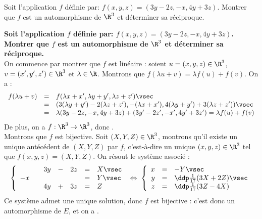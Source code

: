 \documentclass[a4paper, 11pt,reqno]{article}
\begin{document}
\begin{exercice}  \;
	Soit l'application $f$ d\'efinie par: $f(x,y,z)=(3y-2z,-x,4y+3z)$. Montrer que $f$ est un automorphisme de $\R^3$ et d\'eterminer sa r\'eciproque.
\end{exercice}
\begin{correction}  \;
	\textbf{Soit l'application $f$ d\'efinie par: $f(x,y,z)=(3y-2z,-x,4y+3z)$. Montrer que $f$ est un automorphisme de $\R^3$ et d\'eterminer sa r\'eciproque.}\\
	On commence par montrer que $f$ est lin\'eaire : soient $u=(x,y,z) \in \R^3$, $v=(x',y',z') \in \R^3$ et $\lambda \in \R$. Montrons que $f(\lambda u + v) = \lambda f(u) + f(v)$. On a :
	$$\begin{array}{rcl}
			f(\lambda u + v) & = & f(\lambda x + x', \lambda y + y', \lambda z + z') \vsec                                               \\
			                 & = & (3( \lambda y + y') -2(\lambda z + z'),-(\lambda x + x'),4 ( \lambda y + y')+3(\lambda z + z')) \vsec \\
			                 & = & \lambda (3y-2z,-x,4y+3z) + (3y'-2z',-x',4y'+3z') = \lambda f(u) + f(v)
		\end{array}$$
	De plus, on a $f : \R^3 \to \R^3$, donc .\\
	Montrons que $f$ est bijective. Soit $(X,Y,Z) \in \R^3$, montrons qu'il existe un unique ant\'ec\'edent de $(X,Y,Z)$ par $f$, c'est-\`a-dire un unique $(x,y,z) \in \R^3$ tel que $f(x,y,z) = (X,Y,Z)$. On r\'esout le syst\`eme associ\'e :
	$$\left\{ \begin{array}{rcrcrcl}
			   &  & 3y & - & 2z & = & X\vsec  \\
			-x &  &    &   &    & = & Y \vsec \\
			   &  & 4y & + & 3z & = & Z
		\end{array} \right.
		\; \Leftrightarrow \;
		\left\{ \begin{array}{rcl}
			x & = & -Y\vsec                       \\
			y & = & \ddp \frac{1}{17}(3X+2Z)\vsec \\
			z & = & \ddp \frac{1}{17}(3Z-4X)
		\end{array} \right. $$
	Ce syst\`eme admet une unique solution, donc $f$ est bijective : c'est donc un automorphisme de $E$, et on a .
\end{correction}
\end{document}
